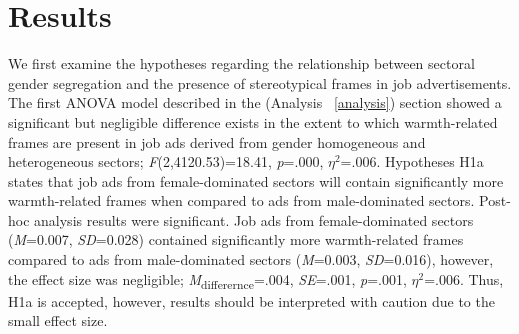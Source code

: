 \documentclass[Royal,sageapa,times]{sagej}
\begin{document}
\section{Results}
\label{results}
We first examine the hypotheses regarding the relationship between sectoral gender segregation and the presence of stereotypical frames in job advertisements. The first ANOVA model described in the (Analysis ~\ref{analysis}) section showed a significant but negligible difference exists in the extent to which warmth-related frames are present in job ads derived from gender homogeneous and heterogeneous sectors; \textit{F}(2,4120.53)=18.41, \textit{p}=.000, \textit{$\eta^2$}=.006. Hypotheses H1a states that job ads from female-dominated sectors will contain significantly more warmth-related frames when compared to ads from male-dominated sectors. Post-hoc analysis results were significant. Job ads from female-dominated sectors (\textit{M}=0.007, \textit{SD}=0.028) contained significantly more warmth-related frames compared to ads from male-dominated sectors (\textit{M}=0.003, \textit{SD}=0.016), however, the effect size was negligible; \textit{M}\textsubscript{differernce}=.004, \textit{SE}=.001, \textit{p}=.001, \textit{$\eta^2$}=.006. Thus, H1a is accepted, however, results should be interpreted with caution due to the small effect size.
\end{document}
